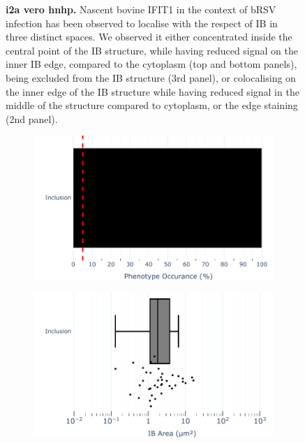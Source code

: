 \begin{figure}
\begin{subfigure}{1\textwidth}
    \end{subfigure}
    \caption[i2a vero hnhp]{\textbf{i2a vero hnhp.} Nascent bovine IFIT1 in the context of bRSV infection has been observed to localise with the respect of IB in three distinct spaces. We observed it either concentrated inside the central point of the IB structure, while having reduced signal on the inner IB edge, compared to the cytoplasm (top and bottom panels), being excluded from the IB structure (3rd panel), or colocalising on the inner edge of the IB structure while having reduced signal in the middle of the structure compared to cytoplasm, or the edge staining (2nd panel).}
    \label{fig:i2a vero hnhp}
\end{figure}


\begin{figure}
    \begin{subfigure}{0.5\textwidth}
        \caption{}
        \includegraphics[width=1\linewidth]{10. Chapter 5/Figs/02. pIB/02. IFIT2A/07. bar_i2a_vero_bnbp.pdf} 
    \end{subfigure}
    \begin{subfigure}{0.5\textwidth}
        \caption{}
        \includegraphics[width=1\linewidth]{10. Chapter 5/Figs/02. pIB/02. IFIT2A/08. box_i2a_vero_bnbp.pdf}

\end{subfigure}
\end{figure}
